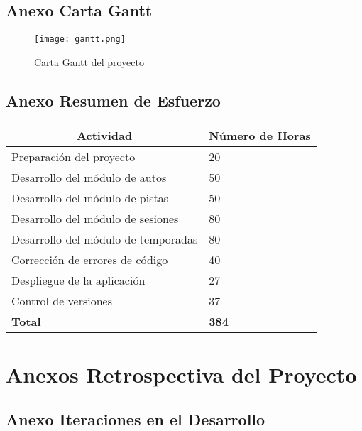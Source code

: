 \subsection{Anexo Carta Gantt}

\begin{figure}[H]
  \begin{center}
    \texttt{[image: gantt.png]}
  \end{center}
  \caption[Carta Gantt del proyecto]{Carta Gantt del proyecto}
  \label{fig:gantt}
\end{figure}

\subsection{Anexo Resumen de Esfuerzo}
\begin{center}
  \begin{tabular}{ | p{10cm} | p{5cm} |}
    \hline
    \multicolumn{1}{|c|}{\textbf{Actividad}} & \multicolumn{1}{|c|}{\textbf{Número de Horas}} \\
    \hline
    
    {Preparación del proyecto} & {20} \\ \hline
    {Desarrollo del módulo de autos} & {50} \\ \hline
    {Desarrollo del módulo de pistas} & {50} \\ \hline
    {Desarrollo del módulo de sesiones} & {80} \\ \hline
    {Desarrollo del módulo de temporadas} & {80} \\ \hline
    {Corrección de errores de código} & {40} \\ \hline
    {Despliegue de la aplicación} & {27} \\ \hline
    {Control de versiones} & {37} \\ \hline
    
    {\textbf{Total}} & {\textbf{384}} \\

    \hline
  \end{tabular}
\end{center}

\newpage

\section{Anexos Retrospectiva del Proyecto}

\subsection{Anexo Iteraciones en el Desarrollo}

